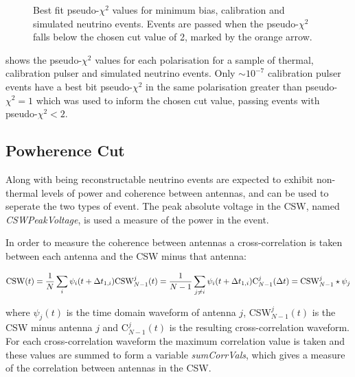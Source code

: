 \begin{figure}[htpb]
  \hfill
  \caption{Best fit pseudo-$\chi^{2}$ values for minimum bias, calibration and simulated neutrino events. Events are passed when the pseudo-$\chi^{2}$ falls below the chosen cut value of 2, marked by the orange arrow.}
  \label{fig:Analysis:Thermal-Cuts:Pseudo-ChiSq}
\end{figure}
  
 shows the pseudo-$\chi^{2}$ values for each polarisation for a sample of thermal, calibration pulser and simulated neutrino events. Only $\sim 10^{-7}$ calibration pulser events have a best bit pseudo-$\chi^{2}$ in the same polarisation greater than pseudo-$\chi^{2}=1$ which was used to inform the chosen cut value, passing events with pseudo-$\chi^{2} < 2$. 

\subsection{Powherence Cut}
\label{sec:Analysis:Thermal-Cuts:Powherence}

Along with being reconstructable neutrino events are expected to exhibit non-thermal levels of power and coherence between antennas, and can be used to seperate the two types of event. The peak absolute voltage in the CSW, named \textit{CSWPeakVoltage}, is used a measure of the power in the event. 

In order to measure the coherence between antennas a cross-correlation is taken between each antenna and the CSW minus that antenna:

\begin{equation}
  \mbox{CSW}(t) = \frac{1}{N}\sum_{i} \psi_{i}(t+\Delta t_{1,i})\\
  \mbox{CSW}_{N-1}^{j}(t) = \frac{1}{N-1}\sum_{j \neq i} \psi_{i}(t+\Delta t_{1,i})\\
  \mbox{C}_{N-1}^{j}(\Delta t) = {\mbox{CSW}_{N-1}^{j} \star \psi_{j}}
\end{equation}

\noindent where $\psi_{j}(t)$ is the time domain waveform of antenna $j$, CSW$_{N-1}^{j}(t)$ is the CSW minus antenna $j$ and C$_{N-1}^{j}(t)$ is the resulting cross-correlation waveform. For each cross-correlation waveform the maximum correlation value is taken and these values are summed to form a variable \textit{sumCorrVals}, which gives a measure of the correlation between antennas in the CSW.

